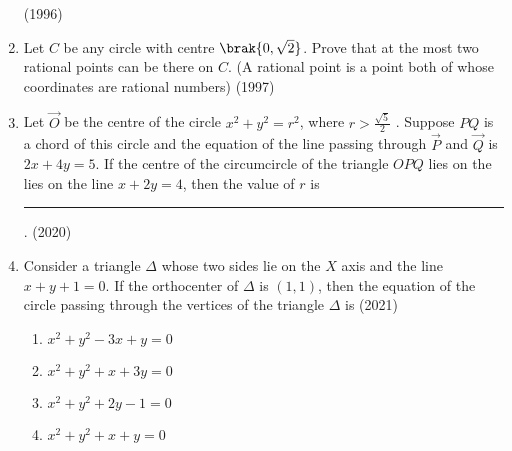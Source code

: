 \begin{enumerate}[label=\thesubsection.\arabic*.,ref=\thesubsection.\theenumi]
\hfill(1996)
%
%
%
%
%
\item Let $C$ be any circle with centre $\brak{0, \sqrt{2}}$. Prove that at the most two rational points can be there on $C$. (A rational point is a point both of whose coordinates are rational numbers)
%
\hfill(1997)
%
%
%
%
%
%
%
%
%
%
%
 \item Let $\vec{O}$ be the centre of the circle $x^2 + y^2 = r^2$, where $r>\frac{\sqrt{5}}{2}$
. Suppose $PQ$ is a chord of this circle and the equation of the line passing through $\vec{P}$ and $\vec{Q}$ is $2x + 4y = 5$. If the centre of the circumcircle of the triangle $OPQ$ lies on the lies on the line $x + 2y = 4$, then the value of $r$ is \rule{1cm}{0.1pt}.
\hfill (2020) 
 \item Consider a triangle $\Delta$ whose two sides lie on the $X$ axis and the line $x + y + 1 = 0$. If the orthocenter of $\Delta$ is $(1, 1)$, then the equation of the circle passing through the vertices of the triangle $\Delta$ is
    \hfill (2021)
\begin{multicols}{2}
\begin{enumerate} 
	 \item  $x^2 + y^2 - 3x + y = 0$  
         \item  $x^2 + y^2 + x + 3y = 0$  
         \item  $x^2 + y^2 + 2y - 1 = 0$  
         \item  $x^2 + y^2 + x + y = 0$
    \end{enumerate}
\end{multicols}
\end{enumerate}
